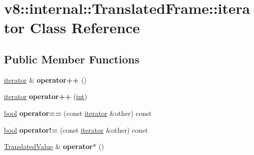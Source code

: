 \hypertarget{classv8_1_1internal_1_1TranslatedFrame_1_1iterator}{}\section{v8\+:\+:internal\+:\+:Translated\+Frame\+:\+:iterator Class Reference}
\label{classv8_1_1internal_1_1TranslatedFrame_1_1iterator}
\subsection*{Public Member Functions}
\begin{DoxyCompactItemize}
\item 
\mbox{\label{classv8_1_1internal_1_1TranslatedFrame_1_1iterator_ac75b4c563335b3953911c65f8597b1c7}} 
\mbox{\hyperlink{classv8_1_1internal_1_1TranslatedFrame_1_1iterator}{iterator}} \& {\bfseries operator++} ()
\item 
\mbox{\label{classv8_1_1internal_1_1TranslatedFrame_1_1iterator_a84b7e7b8d2bcab583035996e5bb22925}} 
\mbox{\hyperlink{classv8_1_1internal_1_1TranslatedFrame_1_1iterator}{iterator}} {\bfseries operator++} (\mbox{\hyperlink{classint}{int}})
\item 
\mbox{\label{classv8_1_1internal_1_1TranslatedFrame_1_1iterator_a3eae251cb7cc5b30dcabc07ef895758a}} 
\mbox{\hyperlink{classbool}{bool}} {\bfseries operator==} (const \mbox{\hyperlink{classv8_1_1internal_1_1TranslatedFrame_1_1iterator}{iterator}} \&other) const
\item 
\mbox{\label{classv8_1_1internal_1_1TranslatedFrame_1_1iterator_ac0a8510597307a06f2692aac835fa6a4}} 
\mbox{\hyperlink{classbool}{bool}} {\bfseries operator!=} (const \mbox{\hyperlink{classv8_1_1internal_1_1TranslatedFrame_1_1iterator}{iterator}} \&other) const
\item 
\mbox{\label{classv8_1_1internal_1_1TranslatedFrame_1_1iterator_a048817150b826239d2ea2405feb69757}} 
\mbox{\hyperlink{classv8_1_1internal_1_1TranslatedValue}{Translated\+Value}} \& {\bfseries operator$\ast$} ()

\end{DoxyCompactItemize}
